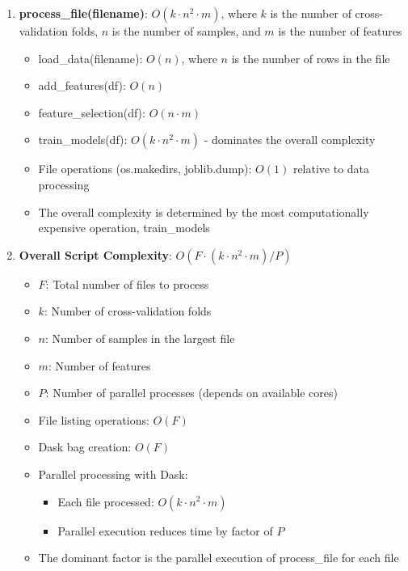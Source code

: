 \documentclass[11pt,a4paper]{article}
\begin{document}
\begin{enumerate}
    \item \textbf{process\_file(filename)}: $O(k \cdot n^2 \cdot m)$, where $k$ is the number of cross-validation folds, $n$ is the number of samples, and $m$ is the number of features
    \begin{itemize}
        \item load\_data(filename): $O(n)$, where $n$ is the number of rows in the file
        \item add\_features(df): $O(n)$
        \item feature\_selection(df): $O(n \cdot m)$
        \item train\_models(df): $O(k \cdot n^2 \cdot m)$ - dominates the overall complexity
        \item File operations (os.makedirs, joblib.dump): $O(1)$ relative to data processing
        \item The overall complexity is determined by the most computationally expensive operation, train\_models
    \end{itemize}

    \item \textbf{Overall Script Complexity}: $O(F \cdot (k \cdot n^2 \cdot m) / P)$
    \begin{itemize}
        \item $F$: Total number of files to process
        \item $k$: Number of cross-validation folds
        \item $n$: Number of samples in the largest file
        \item $m$: Number of features
        \item $P$: Number of parallel processes (depends on available cores)
    \end{itemize}
    \begin{itemize}
        \item File listing operations: $O(F)$
        \item Dask bag creation: $O(F)$
        \item Parallel processing with Dask:
            \begin{itemize}
                \item Each file processed: $O(k \cdot n^2 \cdot m)$
                \item Parallel execution reduces time by factor of $P$
            \end{itemize}
        \item The dominant factor is the parallel execution of process\_file for each file
    \end{itemize}
\end{enumerate}
\end{document}
